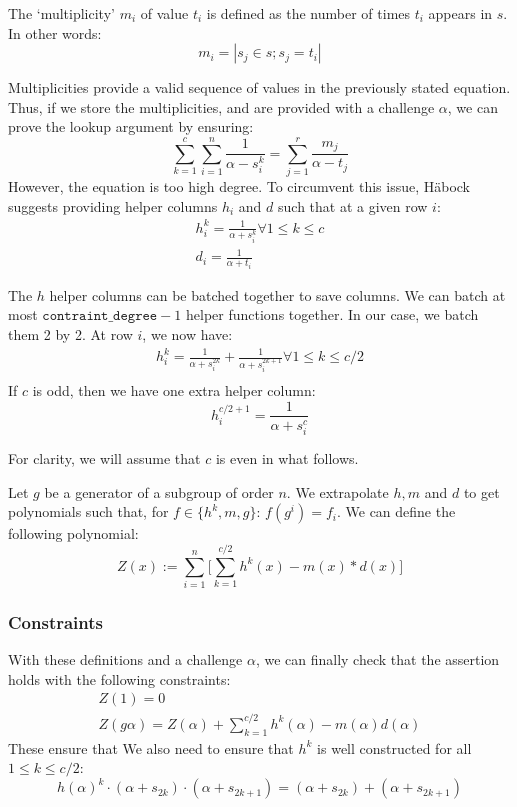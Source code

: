 The `multiplicity' $m_i$ of value $t_i$ is defined as the number of times $t_i$ appears in $s$. In other words:
$$m_i = |s_j \in s; s_j = t_i|$$

Multiplicities provide a valid sequence of values in the previously stated equation. Thus, if we store the multiplicities, and are provided with a challenge $\alpha$, we can prove the lookup argument by ensuring:
$$\sum_{k=1}^c \sum_{i=1}^n \frac{1}{\alpha - s_i^k} = \sum_{j=1}^r \frac{m_j}{\alpha-t_j}$$
However, the equation is too high degree. To circumvent this issue, Häbock suggests providing helper columns $h_i$ and $d$ such that at a given row $i$:
\begin{gather*}
  h_i^k = \frac{1}{\alpha + s_i^k } \forall 1 \leq k \leq c \\
  d_i = \frac{1}{\alpha + t_i}
\end{gather*}

The $h$ helper columns can be batched together to save columns. We can batch at most $\texttt{contraint\_degree} - 1$ helper functions together. In our case, we batch them 2 by 2. At row $i$, we now have:
\begin{align*}
  h_i^k = \frac{1}{\alpha + s_i^{2k}} + \frac{1}{\alpha + s_i^{2k+1}} \forall 1 \leq k \leq c/2 \\
\end{align*}
If $c$ is odd, then we have one extra helper column:
$$h_i^{c/2+1} = \frac{1}{\alpha + s_i^{c}}$$

For clarity, we will assume that $c$ is even in what follows.

Let $g$ be a generator of a subgroup of order $n$. We extrapolate $h, m$ and $d$ to get polynomials such that, for $f \in \{h^k, m, g\}$: $f(g^i) = f_i$.
We can define the following polynomial:
$$ Z(x) :=  \sum_{i=1}^n \big[\sum_{k=1}^{c/2} h^k(x) - m(x) * d(x)\big]$$


\subsubsection{Constraints}
With these definitions and a challenge $\alpha$, we can finally check that the assertion holds with the following constraints:
\begin{gather*}
  Z(1) = 0 \\
  Z(g \alpha) = Z(\alpha) + \sum_{k=1}^{c/2} h^k(\alpha) - m(\alpha) d(\alpha)
\end{gather*}
These ensure that 
We also need to ensure that $h^k$ is well constructed for all $1 \leq k \leq c/2$:
$$
  h(\alpha)^k \cdot (\alpha + s_{2k}) \cdot (\alpha + s_{2k+1}) = (\alpha + s_{2k}) + (\alpha + s_{2k+1})
$$

